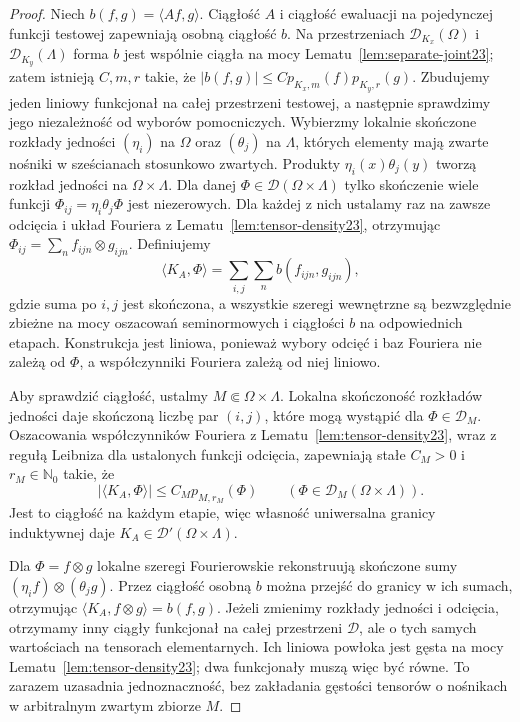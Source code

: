 \documentclass[11pt,a4paper]{article}
\numberwithin{equation}{section}
\theoremstyle{plain}
\theoremstyle{definition}
\theoremstyle{remark}
\newcommand{\N}{\mathbb N}
\begin{document}
\begin{proof}
Niech $b(f,g)=\langle Af,g\rangle$. Ciągłość $A$
i ciągłość ewaluacji na pojedynczej funkcji testowej
zapewniają osobną ciągłość $b$. Na przestrzeniach
$\mathcal D_{K_x}(\Omega)$ i $\mathcal D_{K_y}(\Lambda)$
forma $b$ jest wspólnie ciągła na mocy
Lematu~\ref{lem:separate-joint23}; zatem istnieją
$C,m,r$ takie, że
$|b(f,g)|\le C p_{K_x,m}(f)p_{K_y,r}(g)$.
Zbudujemy jeden liniowy funkcjonał na całej przestrzeni
testowej, a następnie sprawdzimy jego niezależność
od wyborów pomocniczych. Wybierzmy lokalnie skończone
rozkłady jedności $(\eta_i)$ na $\Omega$ oraz
$(\theta_j)$ na $\Lambda$, których elementy mają zwarte
nośniki w sześcianach stosunkowo zwartych. Produkty
$\eta_i(x)\theta_j(y)$ tworzą rozkład jedności na
$\Omega\times\Lambda$. Dla danej
$\Phi\in\mathcal D(\Omega\times\Lambda)$ tylko skończenie
wiele funkcji $\Phi_{ij}=\eta_i\theta_j\Phi$ jest niezerowych.
Dla każdej z nich ustalamy raz na zawsze odcięcia i układ
Fouriera z Lematu~\ref{lem:tensor-density23}, otrzymując
$\Phi_{ij}=\sum_n f_{ijn}\otimes g_{ijn}$.
Definiujemy
\[
 \langle K_A,\Phi\rangle=\sum_{i,j}\sum_n b(f_{ijn},g_{ijn}),
\]
gdzie suma po $i,j$ jest skończona, a wszystkie szeregi
wewnętrzne są bezwzględnie zbieżne na mocy oszacowań
seminormowych i ciągłości $b$ na odpowiednich etapach.
Konstrukcja jest liniowa, ponieważ wybory odcięć i baz
Fouriera nie zależą od $\Phi$, a współczynniki Fouriera
zależą od niej liniowo.

Aby sprawdzić ciągłość, ustalmy $M\Subset\Omega\times\Lambda$.
Lokalna skończoność rozkładów jedności daje skończoną
liczbę par $(i,j)$, które mogą wystąpić dla
$\Phi\in\mathcal D_M$. Oszacowania współczynników
Fouriera z Lematu~\ref{lem:tensor-density23}, wraz
z regułą Leibniza dla ustalonych funkcji odcięcia,
zapewniają stałe $C_M>0$ i $r_M\in\N_0$ takie, że
\[
 |\langle K_A,\Phi\rangle|\le C_M p_{M,r_M}(\Phi)
 \qquad (\Phi\in\mathcal D_M(\Omega\times\Lambda)).
\]
Jest to ciągłość na każdym etapie, więc własność
uniwersalna granicy induktywnej daje
$K_A\in\mathcal D'(\Omega\times\Lambda)$.

Dla $\Phi=f\otimes g$ lokalne szeregi Fourierowskie
rekonstruują skończone sumy
$(\eta_i f)\otimes(\theta_j g)$. Przez ciągłość osobną
$b$ można przejść do granicy w ich sumach, otrzymując
$\langle K_A,f\otimes g\rangle=b(f,g)$.
Jeżeli zmienimy rozkłady jedności i odcięcia, otrzymamy
inny ciągły funkcjonał na całej przestrzeni $\mathcal D$,
ale o tych samych wartościach na tensorach elementarnych.
Ich liniowa powłoka jest gęsta na mocy
Lematu~\ref{lem:tensor-density23}; dwa funkcjonały muszą
więc być równe. To zarazem uzasadnia jednoznaczność,
bez zakładania gęstości tensorów o nośnikach w arbitralnym
zwartym zbiorze $M$.


\end{proof}
\end{document}
